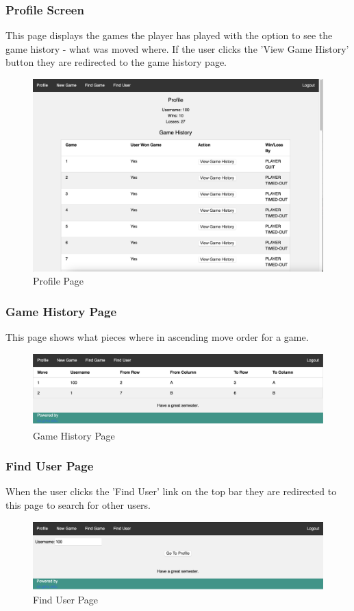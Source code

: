\documentclass[12pt]{article}
\begin{document}
\subsubsection{Profile Screen}
This page displays the games the player has played with the option to see the game history - what was moved where. If the user clicks the 'View Game History' button they are redirected to the game history page.
\begin{figure}[h!]
    \includegraphics[width=\linewidth]{OTHER_PLAYER_PROFILE.png}
    \caption{Profile Page}
\end{figure}
\newpage
\subsubsection{Game History Page}
This page shows what pieces where in ascending move order for a game.
\begin{figure}[h!]
    \includegraphics[width=\linewidth]{GAME_HISTORY.png}
    \caption{Game History Page}
\end{figure}

\subsubsection{Find User Page}
When the user clicks the 'Find User' link on the top bar they are redirected to this page to search for other users.
\begin{figure}[h!]
    \includegraphics[width=\linewidth]{SEARCH_FOR_USER.png}
    \caption{Find User Page}
\end{figure}
\newpage
\end{document}
